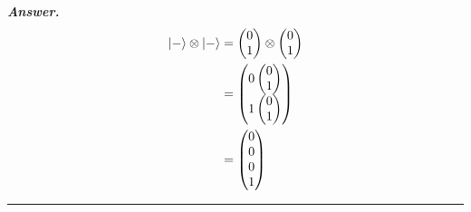 \documentclass[12pt]{article}
\newenvironment{answer}{\noindent\textbf{\textit{Answer.}} \normalfont }{\par\noindent\rule{\textwidth}{0.4pt}}
\begin{document}
\begin{answer}
		\begin{align*}
			\ket{-} \otimes \ket{-} &= \begin{pmatrix} 0 \\ 1 \end{pmatrix} \otimes \begin{pmatrix} 0 \\ 1 \end{pmatrix} \\
			&= \begin{pmatrix} 0\begin{pmatrix} 0 \\ 1 \end{pmatrix} \\ 1\begin{pmatrix} 0 \\ 1 \end{pmatrix} \end{pmatrix} \\
			&= \begin{pmatrix} 0 \\ 0 \\ 0 \\ 1 \end{pmatrix} 
		\end{align*}
		

\end{answer}
\end{document}
